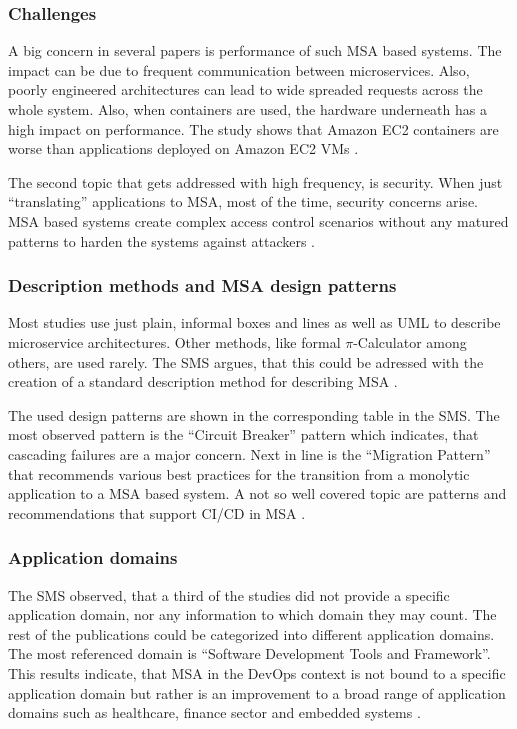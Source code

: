 \subsubsection{Challenges}

A big concern in several papers is performance of such MSA based systems.
The impact can be due to frequent communication between microservices.
Also, poorly engineered architectures can lead to wide spreaded requests
across the whole system. Also, when containers are used, the hardware underneath
has a high impact on performance. The study shows that Amazon EC2 containers are
worse than applications deployed on Amazon EC2 VMs \cite{waseem:SMSMSADevOps}.

The second topic that gets addressed with high frequency, is security. When just ``translating''
applications to MSA, most of the time, security concerns arise. MSA based systems
create complex access control scenarios without any matured patterns to harden
the systems against attackers \cite{waseem:SMSMSADevOps}.

\subsubsection{Description methods and MSA design patterns}

Most studies use just plain, informal boxes and lines as well as UML to
describe microservice architectures. Other methods, like formal $\pi$-Calculator
among others, are used rarely. The SMS argues, that this could be adressed with
the creation of a standard description method for describing MSA
\cite{waseem:SMSMSADevOps}.

The used design patterns are shown in the corresponding table in the SMS.
The most observed pattern is the ``Circuit Breaker'' \cite{montesi:CircuitBreakers} pattern which indicates,
that cascading failures are a major concern. Next in line is the ``Migration
Pattern'' \cite{waseem:SMSMSADevOps} that recommends various best practices for the transition from
a monolytic application to a MSA based system.
A not so well covered topic are patterns and recommendations
that support CI/CD in MSA \cite{waseem:SMSMSADevOps}.

\subsubsection{Application domains}

The SMS observed, that a third of the studies did not provide a specific application
domain, nor any information to which domain they may count. The rest of the publications
could be categorized into different application domains. The most referenced domain
is ``Software Development Tools and Framework''. This results indicate, that MSA
in the DevOps context is not bound to a specific application domain but rather is
an improvement to a broad range of application domains such as healthcare, finance sector
and embedded systems \cite{waseem:SMSMSADevOps}.
